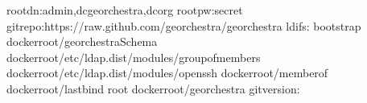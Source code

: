 \documentclass[letterpaper,10pt,french]{sphinxmanual}
\begin{document}
\begin{sphinxVerbatim}[commandchars=\\\{\}]
rootdn:admin,dcgeorchestra,dcorg
rootpw:secret
gitrepo:https://raw.github.com/georchestra/georchestra
ldifs:
\PYGZhy{}bootstrap
\PYGZhy{}docker\PYGZhy{}root/georchestraSchema
\PYGZhy{}docker\PYGZhy{}root/etc/ldap.dist/modules/groupofmembers
\PYGZhy{}docker\PYGZhy{}root/etc/ldap.dist/modules/openssh
\PYGZhy{}docker\PYGZhy{}root/memberof
\PYGZhy{}docker\PYGZhy{}root/lastbind
\PYGZhy{}root
\PYGZhy{}docker\PYGZhy{}root/georchestra
gitversion:


\end{sphinxVerbatim}
\end{document}
